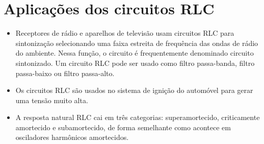 \section{Aplicações dos circuitos RLC}

\begin{itemize}
\item Receptores de rádio e aparelhos de televisão usam circuitos RLC para sintonização selecionando uma faixa estreita de frequência das ondas de rádio do ambiente. Nessa função, o circuito é frequentemente denominado circuito sintonizado. Um circuito RLC pode ser usado como filtro passa-banda, filtro passa-baixo ou filtro passa-alto. 
\item Os circuitos RLC são usados no sistema de ignição do automóvel para gerar uma tensão muito alta.
\item A resposta natural RLC cai em três categorias: superamortecido, criticamente amortecido e subamortecido, de forma semelhante como acontece em osciladores harmônicos amortecidos.
\end{itemize}